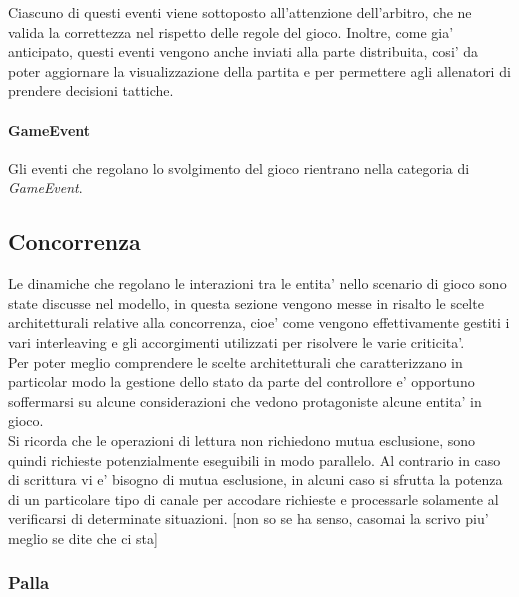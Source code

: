 Ciascuno di questi eventi viene sottoposto all'attenzione dell'arbitro, che ne valida la correttezza nel rispetto delle regole del gioco. Inoltre, come gia' anticipato, questi eventi vengono anche inviati alla parte distribuita, cosi' da poter aggiornare la visualizzazione della partita e per permettere agli allenatori di prendere decisioni tattiche.

\paragraph{GameEvent} Gli eventi che regolano lo svolgimento del gioco rientrano nella categoria di \textit{GameEvent}.

\subsection*{Concorrenza}
%
\label{sec:analisi_concorrenza}

Le dinamiche che regolano le interazioni tra le entita’ nello scenario di gioco sono state discusse nel modello, in questa sezione vengono messe in risalto le scelte architetturali relative alla concorrenza, cioe’ come vengono effettivamente gestiti i vari interleaving e gli accorgimenti utilizzati per risolvere le varie criticita’.\\

Per poter meglio comprendere le scelte architetturali che caratterizzano in particolar modo la gestione dello stato da parte del controllore e’ opportuno soffermarsi su alcune considerazioni che vedono protagoniste alcune entita’ in gioco.\\

Si ricorda che le operazioni di lettura non richiedono mutua esclusione, sono quindi richieste potenzialmente eseguibili in modo parallelo. Al contrario in caso di scrittura vi e’ bisogno di mutua esclusione, in alcuni caso si sfrutta la potenza di un particolare tipo di canale per accodare richieste e processarle solamente al verificarsi di determinate situazioni. [non so se ha senso, casomai la scrivo piu’ meglio se dite che ci sta]

\subsubsection*{Palla}
%
\label{sec:analisi_concorrenza_palla}

